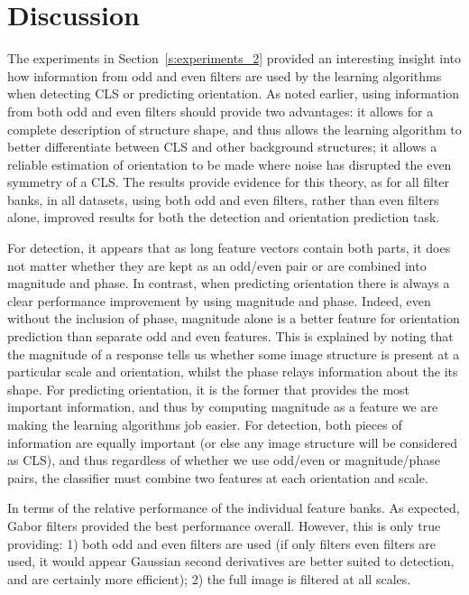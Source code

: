 \documentclass{IEEEtran}
\newcommand{\sref}[1]{Section~\ref{#1}}
\begin{document}
\section{Discussion}
\label{discussion}
%
The experiments in \sref{s:experiments_2} provided an interesting insight into how information from odd and even filters are used by the learning algorithms when detecting CLS or predicting orientation. As noted earlier, using information from both odd and even filters should provide two advantages: it allows for a complete description of structure shape, and thus allows the learning algorithm to better differentiate between CLS and other background structures; it allows a reliable estimation of orientation to be made where noise has disrupted the even symmetry of a CLS. The results provide evidence for this theory, as for all filter banks, in all datasets, using both odd and even filters, rather than even filters alone, improved results for both the detection and orientation prediction task.

For detection, it appears that as long feature vectors contain both parts, it does not matter whether they are kept as an odd/even pair or are combined into magnitude and phase. In contrast, when predicting orientation there is always a clear performance improvement by using magnitude and phase. Indeed, even without the inclusion of phase, magnitude alone is a better feature for orientation prediction than separate odd and even features. This is explained by noting that the magnitude of a response tells us whether some image structure is present at a particular scale and orientation, whilst the phase relays information about the its shape. For predicting orientation, it is the former that provides the most important information, and thus by computing magnitude as a feature we are making the learning algorithms job easier. For detection, both pieces of information are equally important (or else any image structure will be considered as CLS), and thus regardless of whether we use odd/even or magnitude/phase pairs, the classifier must combine two features at each orientation and scale.

In terms of the relative performance of the individual feature banks. As expected, Gabor filters provided the best performance overall. However, this is only true providing: 1) both odd and even filters are used (if only filters even filters are used, it would appear Gaussian second derivatives are better suited to detection, and are certainly more efficient); 2) the full image is filtered at all scales.
\end{document}
